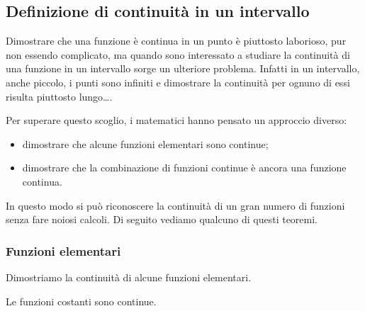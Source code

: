 \begin{comment}
\begin{teorema}[Derivabilità e continuità]
Se una funzione è derivabile in un punto allora è continua in quel punto.
\end{teorema}

\noindent Ipotesi: 
\(f(x) \text{ è derivabile in } c\)
\tab Tesi: 
\(f(x) \text{ è continua in } c\).

\begin{proof}
TODO
\end{proof}
\end{comment}

\subsection{Definizione di continuità in un intervallo}
\label{subsec:cont_definizione}

Dimostrare che una funzione è continua in un punto è piuttosto laborioso, 
pur non essendo complicato, ma quando sono interessato a studiare la 
continuità di una funzione in un intervallo sorge un ulteriore problema. 
Infatti in un intervallo, anche piccolo, i punti sono infiniti e dimostrare 
la continuità per ognuno di essi risulta piuttosto lungo\dots.

Per superare questo scoglio, i matematici hanno pensato un approccio diverso:

\begin{itemize}
 \item dimostrare che alcune funzioni elementari sono continue;
 \item dimostrare che la combinazione di funzioni continue è ancora una 
funzione continua.
\end{itemize}

In questo modo si può riconoscere la continuità di un gran numero di funzioni 
senza fare noiosi calcoli. Di seguito vediamo qualcuno di questi teoremi.

\subsubsection{Funzioni elementari}
\label{subsubsec:cont_funzionielementari}

Dimostriamo la continuità di alcune funzioni elementari.

\begin{teorema}
Le funzioni costanti sono continue.
\end{teorema}

